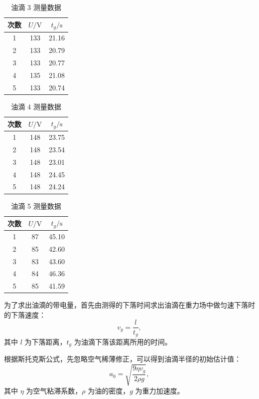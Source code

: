 \documentclass[a4paper,8pt,twocolumn]{article}
\begin{document}
\begin{table}[H]
\centering
\caption{油滴 3 测量数据}
\begin{tabular}{ccc}
\hline
次数 & $U/\mathrm{V}$ & $t_g/\mathrm{s}$ \\
\hline
1 & 133 & 21.16 \\
2 & 133 & 20.79 \\
3 & 133 & 20.77 \\
4 & 135 & 21.08 \\
5 & 133 & 20.74 \\
\hline
\end{tabular}
\end{table}

\begin{table}[H]
\centering
\caption{油滴 4 测量数据}
\begin{tabular}{ccc}
\hline
次数 & $U/\mathrm{V}$ & $t_g/\mathrm{s}$ \\
\hline
1 & 148 & 23.75 \\
2 & 148 & 23.54 \\
3 & 148 & 23.01 \\
4 & 148 & 24.45 \\
5 & 148 & 24.24 \\
\hline
\end{tabular}
\end{table}

\begin{table}[H]
\centering
\caption{油滴 5 测量数据}
\begin{tabular}{ccc}
\hline
次数 & $U/\mathrm{V}$ & $t_g/\mathrm{s}$ \\
\hline
1 & 87 & 45.10 \\
2 & 85 & 42.60 \\
3 & 83 & 43.60 \\
4 & 84 & 46.36 \\
5 & 85 & 41.59 \\
\hline
\end{tabular}
\end{table}


为了求出油滴的带电量，首先由测得的下落时间求出油滴在重力场中做匀速下落时的下落速度：
\begin{equation}
  v_g = \frac{l}{t_g},
\end{equation}
其中 $l$ 为下落距离，$t_g$ 为油滴下落该距离所用的时间。

根据斯托克斯公式，先忽略空气稀薄修正，可以得到油滴半径的初始估计值：
\begin{equation}
  a_0 = \sqrt{\frac{9\eta v_g}{2\rho g}},
\end{equation}
其中 $\eta$ 为空气粘滞系数，$\rho$ 为油的密度，$g$ 为重力加速度。
\end{document}
